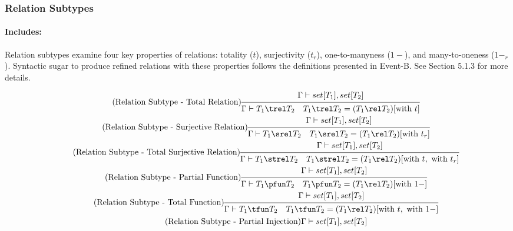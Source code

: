 \documentclass{article}
\newcommand{\ruleSpace}{\ \ \ }
\begin{document}
\subsubsection{Relation Subtypes}
\paragraph{Includes:} Relation subtypes examine four key properties of relations: totality ($t$), surjectivity ($t_r$), one-to-manyness ($1-$), and many-to-oneness ($1-_r$). Syntactic sugar to produce refined relations with these properties follows the definitions presented in Event-B. See Section 5.1.3 for more details.

\begin{gather}
\tag{Relation Subtype - Total Relation}
\begin{prooftree}
\hypo{\Gamma \vdash set[T_1], set[T_2]}
\infer1{\Gamma \vdash T_1 \trel T_2 \ruleSpace T_1 \trel T_2 = (T_1 \rel T_2)[\text{with } t]}
\end{prooftree}
\\
\tag{Relation Subtype - Surjective Relation}
\begin{prooftree}
\hypo{\Gamma \vdash set[T_1], set[T_2]}
\infer1{\Gamma \vdash T_1 \srel T_2 \ruleSpace T_1 \srel T_2 = (T_1 \rel T_2)[\text{with } t_r]}
\end{prooftree}
\\
\tag{Relation Subtype - Total Surjective Relation}
\begin{prooftree}
\hypo{\Gamma \vdash set[T_1], set[T_2]}
\infer1{\Gamma \vdash T_1 \strel T_2 \ruleSpace T_1 \strel T_2 = (T_1 \rel T_2)[\text{with } t, \text{ with } t_r]}
\end{prooftree}
\\
\tag{Relation Subtype - Partial Function}
\begin{prooftree}
\hypo{\Gamma \vdash set[T_1], set[T_2]}
\infer1{\Gamma \vdash T_1 \pfun T_2 \ruleSpace T_1 \pfun T_2 = (T_1 \rel T_2)[\text{with } 1-]}
\end{prooftree}
\\
\tag{Relation Subtype - Total Function}
\begin{prooftree}
\hypo{\Gamma \vdash set[T_1], set[T_2]}
\infer1{\Gamma \vdash T_1 \tfun T_2 \ruleSpace T_1 \tfun T_2 = (T_1 \rel T_2)[\text{with } t, \text{ with } 1-]}
\end{prooftree}
\\
\tag{Relation Subtype - Partial Injection}
\begin{prooftree}
\hypo{\Gamma \vdash set[T_1], set[T_2]}

\end{prooftree}
\end{gather}
\end{document}

